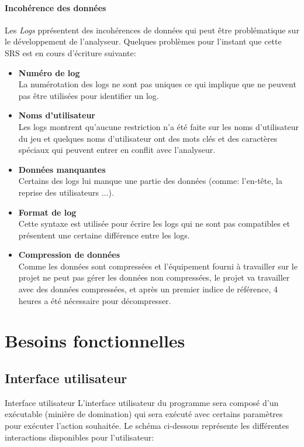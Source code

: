 \documentclass{scrreprt}
\begin{document}
\subsubsection{Incohérence des données}
Les \textit{Logs} pprésentent des incohérences de données qui peut être problématique sur le développement de l'analyseur. Quelques problèmes pour l'instant que cette SRS est en cours d'écriture  suivante:

\begin{itemize}
  \item \textbf{Numéro de log}\\
   La numérotation des logs ne sont pas uniques ce qui implique que ne peuvent pas être utilisées pour identifier un log.
  \item \textbf{Noms d'utilisateur}\\
    Les logs montrent qu'aucune restriction n’a été faite sur les noms d'utilisateur du jeu et quelques noms d'utilisateur ont des mots clés et des caractères spéciaux qui peuvent entrer en conflit avec l'analyseur.
   \item \textbf{Données manquantes}\\
    Certains des logs lui manque une partie des données (comme: l'en-tête, la reprise des utilisateurs $\ldots$).
   \item \textbf{Format de log}\\
    Cette syntaxe est utilisée pour écrire les logs qui ne sont pas compatibles et présentent une certaine différence entre les logs.
    \item \textbf{Compression de données}\\
     Comme les données sont compressées et l'équipement fourni à travailler sur le projet ne peut pas gérer les données non compressées, le projet va travailler avec des données compressées, et après un premier indice de référence, 4 heures a été nécessaire pour décompresser.
\end{itemize}

\chapter{Besoins fonctionnelles}
\iffalse
\section{Interface utilisateur}
  Interface utilisateur
L'interface utilisateur du programme sera composé d'un exécutable (minière de domination) qui sera exécuté avec certains paramètres pour exécuter l'action souhaitée. Le schéma ci-dessous représente les différentes interactions disponibles pour l'utilisateur:\\
\end{document}
